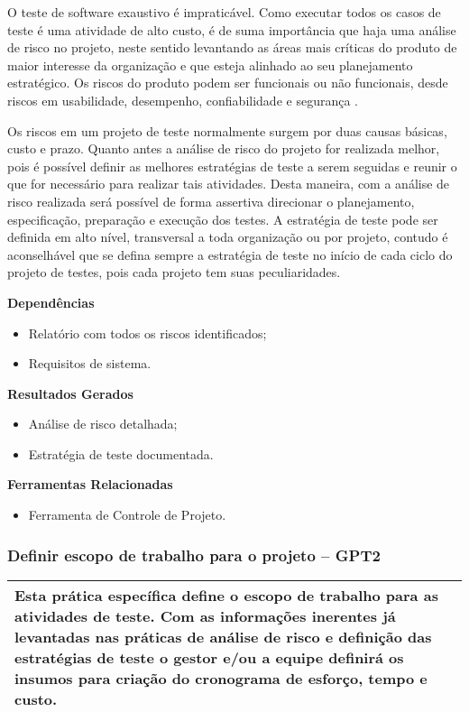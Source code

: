 O teste de software exaustivo é impraticável. Como executar todos os casos de teste é uma atividade de alto custo, é de suma importância que haja uma análise de risco no projeto, neste sentido levantando as áreas mais críticas do produto de maior interesse da organização e que esteja alinhado ao seu planejamento estratégico. Os riscos do produto podem ser funcionais ou não funcionais, desde riscos em usabilidade, desempenho, confiabilidade e segurança \cite{GuiaMPTbr}. 

Os riscos em um projeto de teste normalmente surgem por duas causas básicas, custo e prazo. Quanto antes a análise de risco do projeto for realizada melhor, pois é possível definir as melhores estratégias de teste a serem seguidas e reunir o que for necessário para realizar tais atividades. Desta maneira, com a análise de risco realizada será possível de forma assertiva direcionar o planejamento, especificação, preparação e execução dos testes. A estratégia de teste pode ser definida em alto nível, transversal a toda organização ou por projeto, contudo é aconselhável que se defina sempre a estratégia de teste no início de cada ciclo do projeto de testes, pois cada projeto tem suas peculiaridades.

\textbf{Dependências}

\begin{itemize}
    \item Relatório com todos os riscos identificados;
    \item Requisitos de sistema.
\end{itemize}

\textbf{Resultados Gerados}
\begin{itemize}
    \item Análise de risco detalhada;
    \item Estratégia de teste documentada.
\end{itemize}

\textbf{Ferramentas Relacionadas}
\begin{itemize}
    \item Ferramenta de Controle de Projeto.
\end{itemize}


\subsubsection{Definir escopo de trabalho para o projeto – GPT2}
\label{sec:gpt2}

\begin{table}[!ht]
\centering
\begin{tabular}{|p{130mm}|}
\hline
Esta prática específica define o escopo de trabalho para as atividades de teste. Com as informações inerentes já levantadas nas práticas de análise de risco e definição das estratégias de teste o gestor e/ou a equipe definirá os insumos para criação do cronograma de esforço, tempo e custo. \\ 
\hline
\end{tabular}
\end{table}

